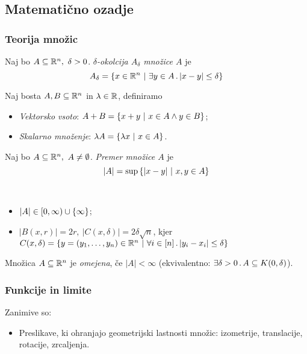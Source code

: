 \newpage
\subsection{Matematično ozadje}
\subsubsection*{Teorija množic}
\begin{definicija}
    Naj bo \(A \subseteq \mathbb{R}^n, \ \delta > 0\). \emph{\(\delta\)-okolcija \(A_\delta\) množice \(A\)} je 
    \[A_\delta = \left\{x \in \mathbb{R}^n \ | \ \exists y \in A \,.\, |x-y| \leq \delta\right\}\]
\end{definicija}

\begin{definicija}
    Naj bosta \(A, B \subseteq \mathbb{R}^n\) in \(\lambda \in \mathbb{R}\), definiramo 
    \begin{itemize}
        \item \emph{Vektorsko vsoto}: \(A + B = \left\{x +y \ | \ x \in A \land y \in B\right\}\);
        \item \emph{Skalarno množenje}: \(\lambda A = \left\{\lambda x \ | \ x \in A\right\}\).
    \end{itemize}
\end{definicija}

\begin{definicija}
    Naj bo \(A \subseteq \mathbb{R}^n, \ A \neq \emptyset\). \emph{Premer množice \(A\)} je 
    \[|A| = \sup \left\{|x - y| \ | \ x, y \in A\right\}\]
\end{definicija}

\begin{opomba} \
    \begin{itemize}
        \item \(|A| \in [0, \infty) \cup \left\{\infty\right\}\);
        \item \(|B(x,r)| = 2r, \ |C(x, \delta)| = 2\delta \sqrt{n}\), kjer \(C(x, \delta) = \left\{y = (y_1, \ldots, y_n) \in \mathbb{R}^n \ | \ \forall i \in [n] \,.\, |y_i - x_i| \leq \delta\right\}\)
    \end{itemize}
\end{opomba}

\begin{definicija}
    Množica \(A \subseteq \mathbb{R}^n\) je \emph{omejena}, če \(|A| < \infty\) (ekvivalentno: \(\exists \delta > 0 \,.\, A \subseteq K(0, \delta)\)). 
\end{definicija}

\subsubsection*{Funkcije in limite}
Zanimive so:
\begin{itemize}
    \item Preslikave, ki ohranjajo geometrijski lastnosti množic: izometrije, translacije, rotacije, zrcaljenja.
\end{itemize}

